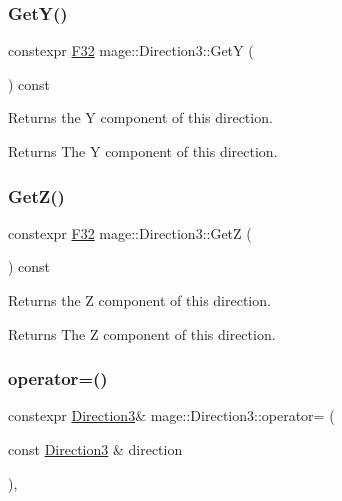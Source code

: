 \subsubsection{\texorpdfstring{Get\+Y()}{GetY()}}
{\footnotesize\ttfamily constexpr \mbox{\hyperlink{namespacemage_aa97e833b45f06d60a0a9c4fc22ae02c0}{F32}} mage\+::\+Direction3\+::\+GetY (\begin{DoxyParamCaption}{ }\end{DoxyParamCaption}) const\hspace{0.3cm}{\ttfamily [noexcept]}}

Returns the Y component of this direction.

\begin{DoxyReturn}{Returns}
The Y component of this direction. 
\end{DoxyReturn}
\mbox{\label{structmage_1_1_direction3_a6ee9bc60c92c37c6ff7e1b432bf191c7}} 
\subsubsection{\texorpdfstring{Get\+Z()}{GetZ()}}
{\footnotesize\ttfamily constexpr \mbox{\hyperlink{namespacemage_aa97e833b45f06d60a0a9c4fc22ae02c0}{F32}} mage\+::\+Direction3\+::\+GetZ (\begin{DoxyParamCaption}{ }\end{DoxyParamCaption}) const\hspace{0.3cm}{\ttfamily [noexcept]}}

Returns the Z component of this direction.

\begin{DoxyReturn}{Returns}
The Z component of this direction. 
\end{DoxyReturn}
\mbox{\label{structmage_1_1_direction3_a500a363a93cded3e36a0704d288d34f3}} 
\subsubsection{\texorpdfstring{operator=()}{operator=()}\hspace{0.1cm}{\footnotesize\ttfamily [1/2]}}
{\footnotesize\ttfamily constexpr \mbox{\hyperlink{structmage_1_1_direction3}{Direction3}}\& mage\+::\+Direction3\+::operator= (\begin{DoxyParamCaption}\item[{const \mbox{\hyperlink{structmage_1_1_direction3}{Direction3}} \&}]{direction }\end{DoxyParamCaption})\hspace{0.3cm}{\ttfamily [default]}, {\ttfamily [noexcept]}}

